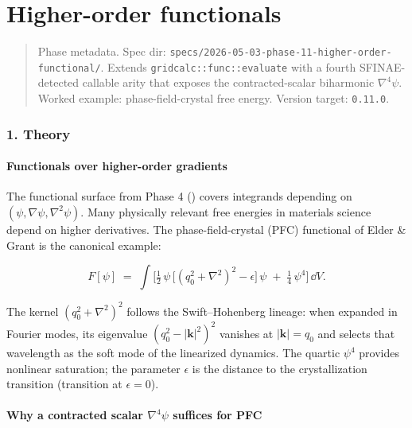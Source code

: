 \chapter{Higher-order functionals}
\label{chap:dev:higher-order-functional}

\begin{quote}
Phase metadata. Spec dir:
\passthrough{\lstinline!specs/2026-05-03-phase-11-higher-order-functional/!}.
Extends \passthrough{\lstinline!gridcalc::func::evaluate!} with a fourth
SFINAE-detected callable arity that exposes the contracted-scalar
biharmonic \(\nabla^4\psi\). Worked example: phase-field-crystal free
energy. Version target: \passthrough{\lstinline!0.11.0!}.
\end{quote}

\subsection{1. Theory}\label{phase11-theory}

\subsubsection{Functionals over higher-order
gradients}\label{phase11-functionals-higher}

The functional surface from Phase 4
() covers integrands depending on
\((\psi, \nabla\psi, \nabla^2\psi)\). Many physically relevant free
energies in materials science depend on higher derivatives. The
phase-field-crystal (PFC) functional of Elder \& Grant is the canonical
example:

\[
F[\psi] \;=\; \int \Big[\tfrac{1}{2}\,\psi\,\big[(q_0^2 + \nabla^2)^2 - \epsilon\big]\,\psi \;+\; \tfrac{1}{4}\,\psi^4\Big]\,\dd V.
\]

The kernel \((q_0^2 + \nabla^2)^2\) follows the Swift--Hohenberg
lineage: when expanded in Fourier modes, its eigenvalue
\((q_0^2 - |\mathbf{k}|^2)^2\) vanishes at
\(|\mathbf{k}| = q_0\) and selects that wavelength as the soft mode of
the linearized dynamics. The quartic \(\psi^4\) provides nonlinear
saturation; the parameter \(\epsilon\) is the distance to the
crystallization transition (transition at \(\epsilon = 0\)).

\subsubsection{Why a contracted scalar
\(\nabla^4\psi\) suffices for PFC}\label{phase11-why-scalar}


